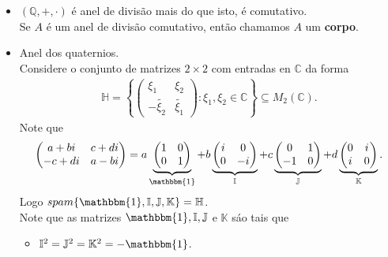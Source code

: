 \begin{example}
  \begin{itemize}
    \item $(\mathbb{Q},+,\cdot)$ é anel de divisão mais do que isto, é comutativo.\\
      Se $A$ é um anel de divisão comutativo, então chamamos $A$ um \textbf{corpo}.
    \item Anel dos quaternios.\\
      Considere o conjunto de matrizes $2\times 2$ com entradas en $\mathbb{C}$ da forma
      \begin{align*}
        \mathbb{H}=\left\{ \begin{pmatrix}
          \xi_{1} & \xi_{2} \\
          -\tilde{\xi_{2}} & \tilde{\xi_1}
        \end{pmatrix}:\xi_1,\xi_2\in\mathbb{C} \right\}\subseteq M_{2}(\mathbb{C}).
      \end{align*}
      Note que
      \begin{align*}
        \begin{pmatrix}
          a+bi & c+di \\
          -c+di & a-bi
        \end{pmatrix}=a \underbrace{\begin{pmatrix}
          1 & 0 \\
          0 & 1
        \end{pmatrix}}_{\mathbbm{1}}+b \underbrace{\begin{pmatrix}
          i & 0 \\
          0 & -i
        \end{pmatrix}}_{\mathbb{I}}+c \underbrace{\begin{pmatrix}
          0 & 1 \\
          -1 & 0
        \end{pmatrix}}_{\mathbb{J}}+d \underbrace{\begin{pmatrix}
          0 & i \\
          i & 0
        \end{pmatrix}}_{\mathbb{K}}.
      \end{align*}
      Logo $spam\{\mathbbm{1},\mathbb{I},\mathbb{J},\mathbb{K}\}=\mathbb{H}$.\\
      Note que as matrizes $\mathbbm{1},\mathbb{I},\mathbb{J}$ e $\mathbb{K}$ sáo tais que
      \begin{itemize}
        \item $\mathbb{I}^{2}=\mathbb{J}^{2}=\mathbb{K}^{2}=-\mathbbm{1}$.

\end{itemize}
\end{itemize}
\end{example}
